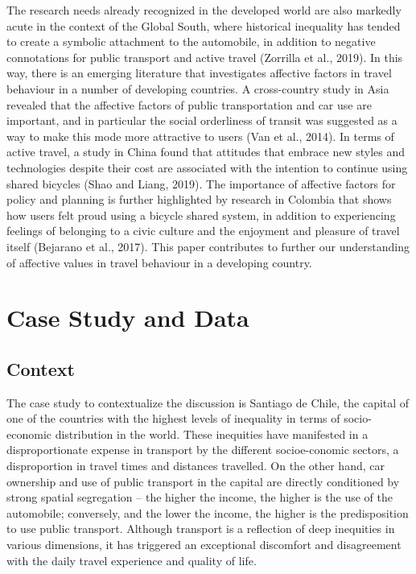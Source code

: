 \documentclass[]{elsarticle} %
\begin{document}
The research needs already recognized in the developed world are also
markedly acute in the context of the Global South, where historical
inequality has tended to create a symbolic attachment to the automobile,
in addition to negative connotations for public transport and active
travel (Zorrilla et al., 2019). In this way, there is an emerging
literature that investigates affective factors in travel behaviour in a
number of developing countries. A cross-country study in Asia revealed
that the affective factors of public transportation and car use are
important, and in particular the social orderliness of transit was
suggested as a way to make this mode more attractive to users (Van et
al., 2014). In terms of active travel, a study in China found that
attitudes that embrace new styles and technologies despite their cost
are associated with the intention to continue using shared bicycles
(Shao and Liang, 2019). The importance of affective factors for policy
and planning is further highlighted by research in Colombia that shows
how users felt proud using a bicycle shared system, in addition to
experiencing feelings of belonging to a civic culture and the enjoyment
and pleasure of travel itself (Bejarano et al., 2017). This paper
contributes to further our understanding of affective values in travel
behaviour in a developing country.

\hypertarget{case-study-and-data}{%
\section{Case Study and Data}\label{case-study-and-data}}

\hypertarget{context}{%
\subsection{Context}\label{context}}

The case study to contextualize the discussion is Santiago de Chile, the
capital of one of the countries with the highest levels of inequality in
terms of socio-economic distribution in the world. These inequities have
manifested in a disproportionate expense in transport by the different
socioe-conomic sectors, a disproportion in travel times and distances
travelled. On the other hand, car ownership and use of public transport
in the capital are directly conditioned by strong spatial segregation --
the higher the income, the higher is the use of the automobile;
conversely, and the lower the income, the higher is the predisposition
to use public transport. Although transport is a reflection of deep
inequities in various dimensions, it has triggered an exceptional
discomfort and disagreement with the daily travel experience and quality
of life.
\end{document}
